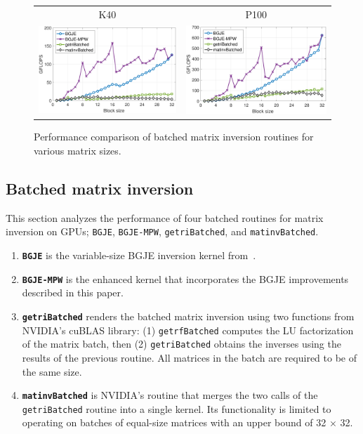 \begin{figure}
\begin{center}
{\scriptsize
\begin{tabular}{cc}
K40 & P100\\
\includegraphics[width=.46\columnwidth]{plots/gje_bs_n_d_K40.pdf}
&
\includegraphics[width=.46\columnwidth]{plots/gje_bs_n_d_P100.pdf}
\end{tabular}
}
\end{center}
\caption{%
Performance comparison of batched matrix inversion routines
    for various matrix sizes.}
\label{fig:bgje-mpw-fixed-batch}
\end{figure}

\subsection{Batched matrix inversion}

This section analyzes the performance of four batched routines for matrix
inversion on GPUs; {\tt BGJE}, {\tt BGJE-MPW}, {\tt getriBatched}, and {\tt matinvBatched}.
\begin{enumerate}
\item
\textbf{\tt BGJE} is the variable-size BGJE inversion kernel from~\cite{Anzt:2017:BGE:3026937.3026940}.
\item
\textbf{\tt BGJE-MPW} is the enhanced kernel that
       incorporates the BGJE improvements described in this paper.
\item
\textbf{\tt getriBatched} renders the batched matrix inversion using two
functions from NVIDIA's cuBLAS library: (1) \texttt{\tt getrfBatched} computes
the LU factorization of the matrix batch, then (2) \texttt{\tt getriBatched}
obtains the inverses using the results of the previous routine. All matrices in
the batch are required to be of the same size.
\item
\textbf{\tt matinvBatched} is NVIDIA's
routine that merges the two calls of the {\tt getriBatched} routine into
a single kernel. Its functionality is limited to operating on batches of
equal-size matrices with an upper bound of 32 $\times$ 32.
\end{enumerate}

